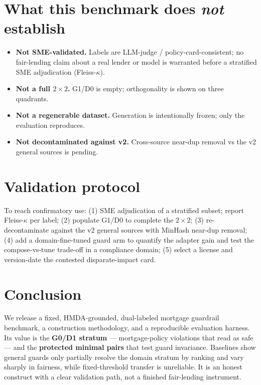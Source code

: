 \documentclass[11pt]{article}
\begin{document}
\section{What this benchmark does \emph{not} establish}
\label{sec:not}
\begin{itemize}[leftmargin=1.4em]
  \item \textbf{Not SME-validated.} Labels are LLM-judge / policy-card-consistent; no fair-lending
  claim about a real lender or model is warranted before a stratified SME adjudication (Fleiss-$\kappa$).
  \item \textbf{Not a full $2\times2$.} G1/D0 is empty; orthogonality is shown on three quadrants.
  \item \textbf{Not a regenerable dataset.} Generation is intentionally frozen; only the evaluation reproduces.
  \item \textbf{Not decontaminated against v2.} Cross-source near-dup removal vs the v2 general sources is pending.
\end{itemize}

\section{Validation protocol}
\label{sec:protocol}
To reach confirmatory use: (1) SME adjudication of a stratified subset; report Fleiss-$\kappa$ per
label; (2) populate G1/D0 to complete the $2\times2$; (3) re-decontaminate against the v2 general
sources with MinHash near-dup removal; (4) add a domain-fine-tuned guard arm to quantify the adapter
gain and test the compose-vs-tune trade-off in a compliance domain; (5) select a license and
version-date the contested disparate-impact card.

\section{Conclusion}
\label{sec:conclusion}
We release a fixed, HMDA-grounded, dual-labeled mortgage guardrail benchmark, a construction
methodology, and a reproducible evaluation harness. Its value is the \textbf{G0/D1 stratum} ---
mortgage-policy violations that read as safe --- and the \textbf{protected minimal pairs} that test
guard invariance. Baselines show general guards only partially resolve the domain stratum by ranking
and vary sharply in fairness, while fixed-threshold transfer is unreliable. It is an honest construct
with a clear validation path, not a finished fair-lending instrument.



\end{document}
